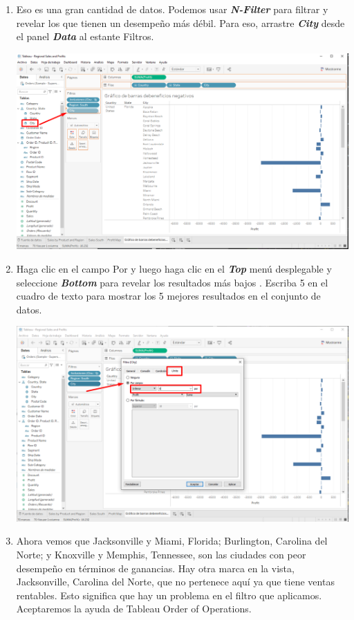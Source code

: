 \documentclass[12pt,letterpaper]{article}
\begin{document}
\begin{enumerate}
\begin{center}
        \end{center}
        \item Eso es una gran cantidad de datos. Podemos usar \textit{\textbf{N-Filter}} para filtrar y revelar los que tienen un desempeño más débil. Para eso, arrastre \textit{\textbf{City}} desde el panel \textit{\textbf{Data}} al estante Filtros.
        \begin{center}
            \includegraphics[width=15cm]{./img/img48.png}
        \end{center}
        \item Haga clic en el campo Por y luego haga clic en el \textit{\textbf{Top}} menú desplegable y seleccione \textit{\textbf{Bottom}} para revelar los resultados más bajos . Escriba 5 en el cuadro de texto para mostrar los 5 mejores resultados en el conjunto de datos.
        \begin{center}
            \includegraphics[width=15cm]{./img/img49.png}
        \end{center}
        \item Ahora vemos que Jacksonville y Miami, Florida; Burlington, Carolina del Norte; y Knoxville y Memphis, Tennessee, son las ciudades con peor desempeño en términos de ganancias. Hay otra marca en la vista, Jacksonville, Carolina del Norte, que no pertenece aquí ya que tiene ventas rentables. Esto significa que hay un problema en el filtro que aplicamos. Aceptaremos la ayuda de Tableau Order of Operations.

\end{enumerate}
\end{document}

